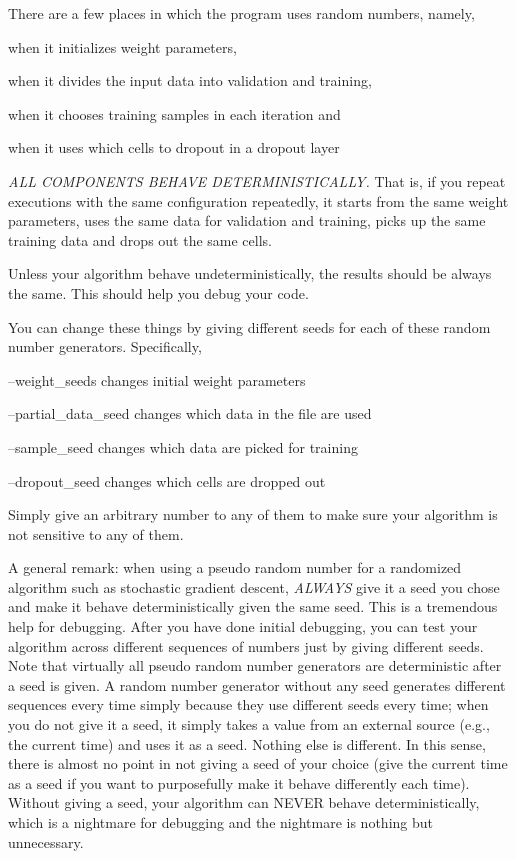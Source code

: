 There are a few places in which the program uses random numbers, namely,


\begin{DoxyItemize}
\item when it initializes weight parameters,
\item when it divides the input data into validation and training,
\item when it chooses training samples in each iteration and
\item when it uses which cells to dropout in a dropout layer
\end{DoxyItemize}

{\itshape A\+LL C\+O\+M\+P\+O\+N\+E\+N\+TS B\+E\+H\+A\+VE D\+E\+T\+E\+R\+M\+I\+N\+I\+S\+T\+I\+C\+A\+L\+LY.} That is, if you repeat executions with the same configuration repeatedly, it starts from the same weight parameters, uses the same data for validation and training, picks up the same training data and drops out the same cells.

Unless your algorithm behave undeterministically, the results should be always the same. This should help you debug your code.

You can change these things by giving different seeds for each of these random number generators. Specifically,


\begin{DoxyItemize}
\item --weight\+\_\+seeds changes initial weight parameters
\item --partial\+\_\+data\+\_\+seed changes which data in the file are used
\item --sample\+\_\+seed changes which data are picked for training
\item --dropout\+\_\+seed changes which cells are dropped out
\end{DoxyItemize}

Simply give an arbitrary number to any of them to make sure your algorithm is not sensitive to any of them.

A general remark\+: when using a pseudo random number for a randomized algorithm such as stochastic gradient descent, {\itshape A\+L\+W\+A\+YS} give it a seed you chose and make it behave deterministically given the same seed. This is a tremendous help for debugging. After you have done initial debugging, you can test your algorithm across different sequences of numbers just by giving different seeds. Note that virtually all pseudo random number generators are deterministic after a seed is given. A random number generator without any seed generates different sequences every time simply because they use different seeds every time; when you do not give it a seed, it simply takes a value from an external source (e.\+g., the current time) and uses it as a seed. Nothing else is different. In this sense, there is almost no point in not giving a seed of your choice (give the current time as a seed if you want to purposefully make it behave differently each time). Without giving a seed, your algorithm can N\+E\+V\+ER behave deterministically, which is a nightmare for debugging and the nightmare is nothing but unnecessary.

